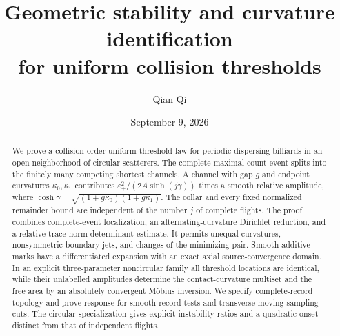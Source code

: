 
\title[Geometric collision thresholds]{Geometric stability and curvature identification\\for uniform collision thresholds}
\author{Qian Qi}
\date{September 9, 2026}

\begin{abstract}
We prove a collision-order-uniform threshold law for periodic dispersing
billiards in an open neighborhood of circular scatterers. The complete
maximal-count event splits into the finitely many competing shortest
channels. A channel with gap $g$ and endpoint curvatures $\kappa_0,\kappa_1$
contributes $\varepsilon_+^2/(2A\sinh(j\gamma))$ times a smooth relative
amplitude, where $\cosh\gamma=\sqrt{(1+g\kappa_0)(1+g\kappa_1)}$.
The collar and every fixed normalized remainder bound are independent of
the number $j$ of complete flights. The proof combines complete-event
localization, an alternating-curvature Dirichlet reduction, and a relative
trace-norm determinant estimate. It permits unequal curvatures, nonsymmetric
boundary jets, and changes of the minimizing pair. Smooth additive marks
have a differentiated expansion with an exact axial source-convergence
domain. In an explicit three-parameter noncircular family all threshold
locations are identical, while their unlabelled amplitudes determine the
contact-curvature multiset and the free area by an absolutely convergent
M\"obius inversion. We specify complete-record topology and prove response
for smooth record tests and transverse moving sampling cuts. The circular specialization gives explicit instability ratios and a
quadratic onset distinct from that of independent flights.
\end{abstract}
\maketitle














